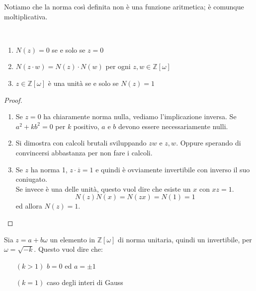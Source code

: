 \begin{osservazione}
	Notiamo che la norma così definita non è una funzione aritmetica; è comunque moltiplicativa.
\end{osservazione}
\begin{proposizione}\
	\begin{enumerate}
		\item $N(z)=0$ se e solo se $z=0$
		\item $N(z\cdot w)=N(z)\cdot N(w)$ per ogni $z,w\in\mathbb{Z}[\omega]$
		\item $z\in\mathbb{Z}[\omega]$ è una unità se e solo se $N(z)=1$
	\end{enumerate}
\end{proposizione}
\begin{proof}\
	\begin{enumerate}
		\item Se $z=0$ ha chiaramente norma nulla, vediamo l'implicazione inversa. Se $a^2+kb^2=0$ per $k$ positivo, $a$ e $b$ devono essere necessariamente nulli.
		\item Si dimostra con calcoli brutali sviluppando $zw$ e $z,w$. Oppure sperando di convincersi abbastanza per non fare i calcoli.
		\item Se $z$ ha norma 1, $z\cdot\overline{z}=1$ e quindi è ovviamente invertibile con inverso il suo coniugato.\\
		Se invece è una delle unità, questo vuol dire che esiste un $x$ con $xz=1$. 
		\begin{equation*}
			N(z)N(x) = N(zx)=N(1)=1
		\end{equation*}
		ed allora $N(z)=1$.
	\end{enumerate}
\end{proof}
\begin{osservazione}
	Sia $z=a+b\omega$ un elemento in $\mathbb{Z}[\omega]$ di norma unitaria, quindi un invertibile, per $\omega=\sqrt{-k}$. Questo vuol dire che:
	\begin{itemize}
		\item[$(k>1)$] $b=0$ ed $a=\pm1$
		\item[$(k=1)$] caso degli interi di Gauss
	\end{itemize}
\end{osservazione}




